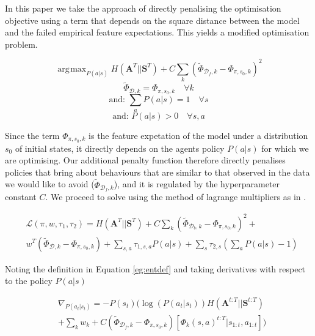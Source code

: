 \documentclass[letterpaper]{article}
\DeclareMathOperator*{\argmax}{\arg\!\max}
\begin{document}
	In this paper we take the approach of directly penalising the optimisation objective using a term that depends on the square distance between the model and the failed empirical feature expectations. 
	This yields a modified optimisation problem. 



\begin{equation}
	\argmax_{P(a|s)} H(\mathbf{A}^T||\mathbf{S}^T) + 	C\sum_k(\widetilde{\Phi}_{\mathcal{D}_f,k}-\Phi_{\pi,s_0,k})^2
\end{equation}
\begin{equation}
	\widetilde{\Phi}_{\mathcal{D},k}   = \Phi_{\pi,s_0,k} \quad \forall k \label{eq:good_ineq}
\end{equation}
\begin{equation}
	\text{and:   }\sum_aP(a|s)  = 1 \quad \forall s  
\end{equation}
\begin{equation}
	\text{and:   }P(a|s)  > 0 \quad \forall s,a  
\end{equation}

Since the term $\Phi_{\pi,s_0,k}$ is the feature expetation of the model under a distribution $s_0$ of initial states, it directly depends on the agents policy $P(a|s)$ for which we are optimising. Our additional penalty function therefore directly penalises policies that bring about behaviours that are similar to that observed in the data we would like to avoid ($\widetilde{\Phi}_{\mathcal{D}_f,k}$), and it is regulated by the hyperparameter constant $C$. We proceed to solve using the method of lagrange multipliers as in \cite{ziebart2010modelingthesis}. 

\begin{equation}
	\begin{split}
	&\mathcal{L}(\pi,w,\tau_1,\tau_2) = H(\mathbf{A}^T||\mathbf{S}^T) +C\sum_k(\widetilde{\Phi}_{\mathcal{D}_b,k}-\Phi_{\pi,s_0,k})^2 +\\
	& {w}^T(\widetilde{\Phi}_{\mathcal{D},k}-\Phi_{\pi,s_0,k}) + \sum_{s,a}\tau_{1,s,a} P(a|s) + \sum_s\tau_{2,s} (\sum_aP(a|s)-1)
	\end{split}
\end{equation}

Noting the definition in Equation \ref{eg:entdef} and taking derivatives with respect to the policy $P(a|s)$

\begin{equation}
 \begin{split}
 &\nabla_{P(a_t|s_t)}=  - P(s_{t}) \Big(\log(P(a_t|s_t))H(\mathbf{A}^{t:T}||\mathbf{S}^{t:T})\\
 & +\sum_k w_k + C(\widetilde{\Phi}_{\mathcal{D}_f,k}-\Phi_{\pi,s_0,k}) [\Phi_k(s,a)^{t:T}|s_{1:t},a_{1:t}]\Big) \label{eqn:der1}
 \end{split}
\end{equation}
\end{document}
